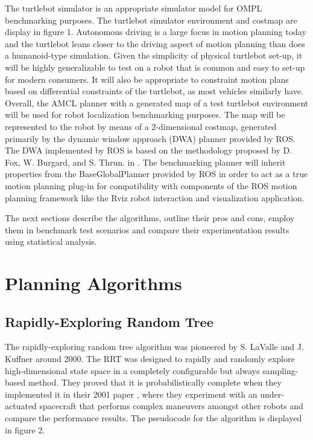 \documentclass[conference]{IEEEtran} \usepackage[T1]{fontenc} \usepackage[backend=biber, style=ieee]{biblatex}
\begin{document}
The turtlebot simulator is an appropriate simulator model for OMPL benchmarking purposes. The turtlebot simulator environment and costmap are display in figure 1. 
Autonomous driving is a large focus in motion planning today and the turtlebot leans closer to the driving aspect of motion planning than does a humanoid-type simulation. 
Given the simplicity of physical turtlebot set-up, it will be highly generalizable to test on a robot that is common and easy to set-up for modern consumers. It will also 
be appropriate to constraint motion plans based on differential constraints of the turtlebot, as most vehicles similarly have. Overall, the AMCL planner with a generated 
map of a test turtlebot environment will be used for robot localization benchmarking purposes. The map will be represented to the robot by means of a 2-dimensional 
costmap, generated primarily by the dynamic window approach (DWA) planner provided by ROS. The DWA implemented by ROS is based on the methodology proposed by D. Fox, W. 
Burgard, and S. Thrun. in \cite{dwa}. The benchmarking planner will inherit properties from the BaseGlobalPlanner provided by ROS in order to act as a true motion 
planning plug-in for compatibility with components of the ROS motion planning framework like the Rviz robot interaction and visualization application.

The next sections describe the algorithms, outline their pros and cons, employ them in benchmark test scenarios and compare their experimentation results using 
statistical analysis.

\section{Planning Algorithms} \label{Planning Algorithms}

\subsection{Rapidly-Exploring Random Tree} \label{RRT}
The rapidly-exploring random tree algorithm was pioneered by S. LaValle and J. Kuffner around 2000. The RRT was designed to rapidly and randomly explore high-dimensional
state space in a completely configurable but always sampling-based method. They proved that it is probabilistically complete when they implemented it in their 2001 paper 
\cite{random_kinodynamics}, where they experiment with an under-actuated spacecraft that performs complex maneuvers amongst other robots and compare the performance 
results. The pseudocode for the algorithm is displayed in figure 2.
\end{document}
